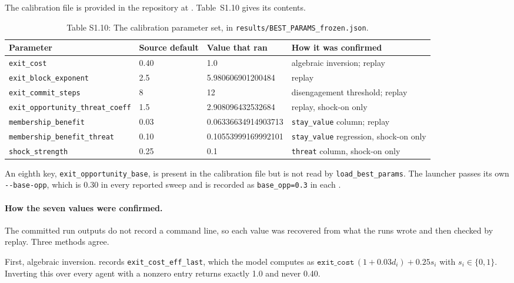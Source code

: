 \documentclass[12pt]{article}
\begin{document}
The calibration file is provided in the repository at
. Table~S1.10 gives its contents.

\begin{table}[htbp]
\centering
\footnotesize
\caption{Table S1.10: The calibration parameter set, in
\texttt{results/BEST\_PARAMS\_frozen.json}.}
\begin{tabular}{p{5.4cm}p{2.2cm}p{2.2cm}p{3.4cm}}
\toprule
Parameter & Source default & Value that ran & How it was confirmed \\
\midrule
\texttt{exit\_cost} & 0.40 & 1.0 & algebraic inversion; replay \\
\texttt{exit\_block\_exponent} & 2.5 & 5.980606901200484 & replay \\
\texttt{exit\_commit\_steps} & 8 & 12 & disengagement threshold; replay \\
\texttt{exit\_opportunity\_threat\_coeff} & 1.5 & 2.908096432532684 & replay, shock-on only \\
\texttt{membership\_benefit} & 0.03 & 0.06336634914903713 & \texttt{stay\_value} column; replay \\
\texttt{membership\_benefit\_threat} & 0.10 & 0.10553999169992101 & \texttt{stay\_value} regression, shock-on only \\
\texttt{shock\_strength} & 0.25 & 0.1 & \texttt{threat} column, shock-on only \\
\bottomrule
\end{tabular}
\end{table}

An eighth key, \texttt{exit\_opportunity\_base}, is present in the calibration
file but is not read by \texttt{load\_best\_params}. The launcher passes its own
\texttt{-{}-base-opp}, which is 0.30 in every reported sweep and is recorded as
\texttt{base\_opp=0.3} in each .

\paragraph{How the seven values were confirmed.}
The committed run outputs do not record a command line, so each value was
recovered from what the runs wrote and then checked by replay. Three methods
agree.

First, algebraic inversion.  records
\texttt{exit\_cost\_eff\_last}, which the model computes as
$\texttt{exit\_cost}\,(1+0.03d_i)+0.25s_i$ with $s_i\in\{0,1\}$. Inverting this
over every agent with a nonzero entry returns exactly 1.0 and never 0.40.
\end{document}
